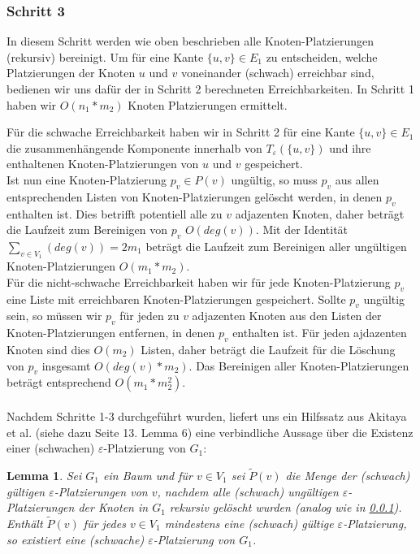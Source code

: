 \documentclass[a4paper, 12pt, twoside]{article}
\theoremstyle{Format1} %
\newtheorem{Lem}[Def]{Lemma}                %
\begin{document}
\subsubsection{Schritt 3} \label{Schritt 3}
In diesem Schritt werden wie oben beschrieben alle Knoten-Platzierungen (rekursiv) bereinigt.
Um für eine Kante $\{u,v\} \in E_1$ zu entscheiden, welche Platzierungen der Knoten $u$ und $v$ voneinander (schwach) erreichbar sind, bedienen wir uns dafür der in
Schritt 2 berechneten Erreichbarkeiten. In Schritt 1 haben wir $O(n_1*m_2)$ Knoten Platzierungen ermittelt.

Für die schwache Erreichbarkeit haben wir in Schritt 2 für eine Kante $\{u,v\} \in E_1$ die zusammenhängende Komponente innerhalb von $T_{\varepsilon}(\{u,v\})$
und ihre enthaltenen Knoten-Platzierungen von $u$ und $v$ gespeichert.
\\
Ist nun eine Knoten-Platzierung $p_v \in P(v)$ ungültig, so muss $p_v$ aus allen entsprechenden Listen von Knoten-Platzierungen gelöscht werden, in
denen $p_v$ enthalten ist. Dies betrifft potentiell alle zu $v$ adjazenten Knoten, daher beträgt die Laufzeit zum Bereinigen von $p_v$ $O(deg(v))$.
Mit der Identität $\sum_{v \in V_1}(deg(v)) = 2m_1$ beträgt die Laufzeit zum Bereinigen aller ungültigen Knoten-Platzierungen $O(m_1*m_2)$.
\\
Für die nicht-schwache Erreichbarkeit haben wir für jede Knoten-Platzierung $p_v$ eine Liste mit erreichbaren Knoten-Platzierungen gespeichert.
Sollte $p_v$ ungültig sein, so müssen wir $p_v$ für jeden zu $v$ adjazenten Knoten aus den Listen der Knoten-Platzierungen entfernen, in denen $p_v$ enthalten ist.
Für jeden ajdazenten Knoten sind dies $O(m_2)$ Listen, daher beträgt die Laufzeit für die Löschung von $p_v$ insgesamt $O(deg(v)*m_2)$.
Das Bereinigen aller Knoten-Platzierungen beträgt entsprechend $O(m_1*m_2^2)$.
\\
\\
Nachdem Schritte 1-3 durchgeführt wurden, liefert uns ein Hilfssatz aus Akitaya et al. (siehe dazu Seite 13. Lemma 6) eine verbindliche Aussage über die Existenz
einer (schwachen) $\varepsilon$-Platzierung von $G_1$:

\begin{Lem} \label {Lemma 1}
	Sei $G_1$ ein Baum und für $v \in V_1$ sei $\tilde{P}(v)$ die Menge der (schwach) gültigen $\varepsilon$-Platzierungen von $v$, nachdem
	alle (schwach) ungültigen $\varepsilon$-Platzierungen der Knoten in $G_1$ rekursiv gelöscht wurden (analog wie in \ref{Schritt 3}).
	Enthält $\tilde{P}(v)$ für jedes $v \in V_1$ mindestens eine (schwach) gültige $\varepsilon$-Platzierung, so existiert
	eine (schwache) $\varepsilon$-Platzierung von $G_1$.
\end{Lem}
\end{document}
